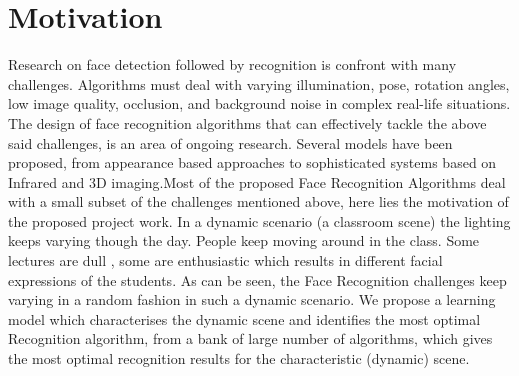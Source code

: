 \section{Motivation}

Research on face detection followed by recognition is confront with many challenges. Algorithms must deal with varying illumination, pose, rotation angles, low image quality, occlusion, and background noise in complex real-life situations. The design of face recognition algorithms that can effectively tackle the above said challenges, is an area of ongoing research. Several models have been proposed, from appearance based approaches to sophisticated systems based on Infrared and 3D imaging.Most of the proposed Face Recognition Algorithms deal with a small subset of the challenges mentioned above, here lies the motivation of the proposed project work. In a dynamic scenario (a classroom scene) the lighting keeps varying though the day. People keep moving around in the class. Some lectures are dull , some are enthusiastic which results in different facial expressions of the students. As can be seen, the Face Recognition challenges keep varying in a random fashion in such a dynamic scenario. We propose a learning model which characterises the dynamic scene and identifies the most optimal Recognition algorithm, from a bank of large number of algorithms, which gives the most optimal recognition results for the characteristic (dynamic) scene.